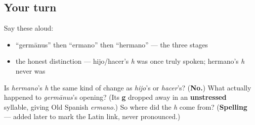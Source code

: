 \subsection*{Your turn}
Say these aloud:

\begin{itemize}
\raggedright
  \item \textquotedblleft{}germānus\textquotedblright{} then \textquotedblleft{}ermano\textquotedblright{} then \textquotedblleft{}hermano\textquotedblright{} — the three stages
  \item the honest distinction — hijo/hacer's \emph{h} was once truly spoken; hermano's \emph{h} never was
\end{itemize}

\begin{tcolorbox}[breakable,colback=teal!4,colframe=teal!35!black,title={Before you move on}]
Is \emph{hermano}'s \emph{h} the same kind of change as \emph{hijo}'s or \emph{hacer}'s? (\textbf{No.}) What actually happened to \emph{germānus}'s opening? (Its \textbf{g} dropped away in an \textbf{unstressed} syllable, giving Old Spanish \emph{ermano}.) So where did the \emph{h} come from? (\textbf{Spelling} — added later to mark the Latin link, never pronounced.)
\end{tcolorbox}

